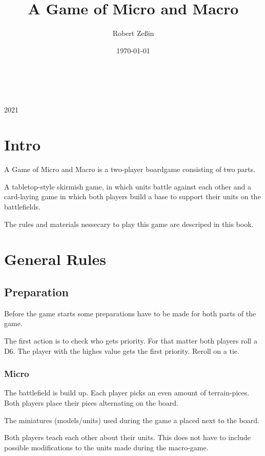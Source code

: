\documentclass[a5paper,pagesize,10pt,bibtotoc,pointlessnumbers,
normalheadings,DIV=9,twoside=false]{scrbook}
\title{A Game of Micro and Macro}
\author{Robert Zeßin}
\date{\today}
\begin{document}
\begin{titlepage}
		\\
			
		\vspace{10mm}
		\\
		\vspace{\fill}
		\centering \large{2021}
\end{titlepage}

\newpage
\chapter{Intro}

A Game of Micro and Macro is a two-player boardgame consisting of two parts.

A tabletop-style skirmish game, in which units battle against each other and a card-laying game in which both players build a base to support their units on the battlefields.

The rules and materials nessecary to play this game are descriped in this book.

\newpage
\tableofcontents 


\newpage
\chapter{General Rules}

\section{Preparation}
Before the game starts some preparations have to be made for both parts of the game.

The first action is to check who gets priority. For that matter both players roll a D6. The player with the highes value gets the first priority. Reroll on a tie.

\subsection{Micro}
The battlefield is build up. Each player picks an even amount of terrain-pices. Both players place their pices alternating on the board.

The miniatures (models/units) used during the game a placed next to the board.

Both players teach each other about their units. This does not have to include possible modifications to the units made during the macro-game.
\end{document}
